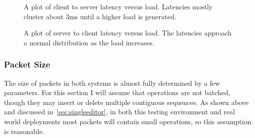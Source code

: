 \documentclass[12pt,a4paper,twoside,openright]{report}
\begin{document}
			
			\begin{figure}[H]
				\centering
					
				\caption[Client-Server Latency] {A plot of client to server latency versus load. Latencies mostly cluster about 3ms until a higher load is generated.}
				\label{fig:latency-cs}
			\end{figure}
			\begin{figure}[H]
				\centering
					
				\caption[Server-Client Latencies] {A plot of server to client latency versus load. The latencies approach a normal distribution as the load increases.}
				\label{fig:latency-sc}
			\end{figure}
	
		
		\subsubsection{Packet Size}
			The size of packets in both systems is almost fully determined by a few parameters. For this section I will assume that operations are not batched, though they may insert or delete multiple contiguous sequences. As shown above and discussed in~\cref{sec:singleeditor}, in both this testing environment and real world deployments most packets will contain small operations, so this assumption is reasonable.
			
\end{document}
